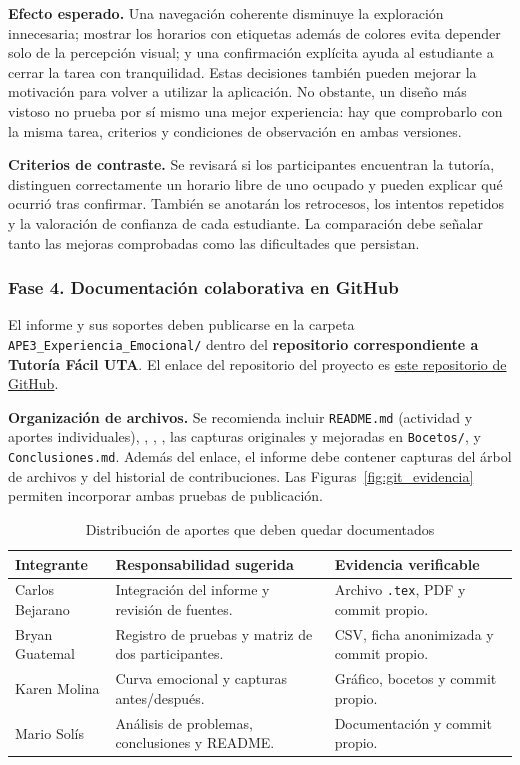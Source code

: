 \documentclass[10pt,letterpaper]{article}
\newcommand{\urlrepositorio}{https://github.com/VK0691/Interaccion-Humano-Computador.git}
\begin{document}
\textbf{Efecto esperado.} Una navegación coherente disminuye la exploración innecesaria; mostrar los horarios con etiquetas además de colores evita depender solo de la percepción visual; y una confirmación explícita ayuda al estudiante a cerrar la tarea con tranquilidad. Estas decisiones también pueden mejorar la motivación para volver a utilizar la aplicación. No obstante, un diseño más vistoso no prueba por sí mismo una mejor experiencia: hay que comprobarlo con la misma tarea, criterios y condiciones de observación en ambas versiones.

\textbf{Criterios de contraste.} Se revisará si los participantes encuentran la tutoría, distinguen correctamente un horario libre de uno ocupado y pueden explicar qué ocurrió tras confirmar. También se anotarán los retrocesos, los intentos repetidos y la valoración de confianza de cada estudiante. La comparación debe señalar tanto las mejoras comprobadas como las dificultades que persistan.

\subsubsection{Fase 4. Documentación colaborativa en GitHub}
El informe y sus soportes deben publicarse en la carpeta \texttt{APE3\_Experiencia\_Emocional/} dentro del \textbf{repositorio correspondiente a Tutoría Fácil UTA}. El enlace del repositorio del proyecto es \href{\urlrepositorio}{este repositorio de GitHub}.

\textbf{Organización de archivos.} Se recomienda incluir \texttt{README.md} (actividad y aportes individuales), , , , las capturas originales y mejoradas en \texttt{Bocetos/}, y \texttt{Conclusiones.md}. Además del enlace, el informe debe contener capturas del árbol de archivos y del historial de contribuciones. Las Figuras~\ref{fig:git_evidencia} permiten incorporar ambas pruebas de publicación.

\begin{table}[H]\centering\small
\caption{Distribución de aportes que deben quedar documentados}\label{tab:git}
\begin{tabularx}{\linewidth}{@{}p{2.9cm}X p{3cm}@{}}\toprule
\textbf{Integrante}&\textbf{Responsabilidad sugerida}&\textbf{Evidencia verificable}\\\midrule
Carlos Bejarano&Integración del informe y revisión de fuentes.&Archivo \texttt{.tex}, PDF y commit propio.\\
Bryan Guatemal&Registro de pruebas y matriz de dos participantes.&CSV, ficha anonimizada y commit propio.\\
Karen Molina&Curva emocional y capturas antes/después.&Gráfico, bocetos y commit propio.\\
Mario Solís&Análisis de problemas, conclusiones y README.&Documentación y commit propio.\\\bottomrule
\end{tabularx}\end{table}
\end{document}
